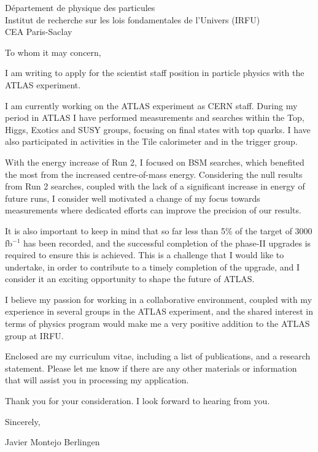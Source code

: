 \documentclass[11pt,a4paper,sans]{moderncv}        %
\begin{document}
\makecvtitle
D\'{e}partement de physique des particules \\
Institut de recherche sur les lois fondamentales de l'Univers (IRFU) \\
CEA Paris-Saclay \\
\newline
 

To whom it may concern,
\newline

I am writing to apply for the scientist staff position in particle physics with the ATLAS experiment.
\newline

I am currently working on the ATLAS experiment as CERN staff. During my period in ATLAS I have performed measurements and searches within the Top, Higgs, Exotics and SUSY groups, focusing on final states with top quarks. I have also participated in activities in the Tile calorimeter and in the trigger group. 
\newline

With the energy increase of Run 2, I focused on BSM searches, which benefited the most from the increased centre-of-mass energy. Considering the null results from Run 2 searches, coupled with the lack of a significant increase in energy of future runs, I consider well motivated a change of my focus towards measurements where dedicated efforts can improve the precision of our results.

It is also important to keep in mind that so far less than 5\% of the target of 3000 fb$^{-1}$ has been recorded, and the successful completion of the phase-II upgrades is required to ensure this is achieved. This is a challenge that I would like to undertake, in order to contribute to a timely completion of the upgrade, and I consider it an exciting opportunity to shape the future of ATLAS.
\newline

I believe my passion for working in a collaborative environment, coupled with my experience in several groups in the ATLAS experiment, and the shared interest in terms of physics program would
make me a very positive addition to the ATLAS group at IRFU.
\newline

Enclosed are my curriculum vitae, including a list of publications, and a research
statement. Please let me know if there are any other materials or information that will assist you in
processing my application.
\newline

Thank you for your consideration. I look forward to hearing from you.
\newline

Sincerely,

\vfill
Javier Montejo Berlingen
\end{document}
